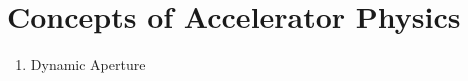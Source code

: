 \chapter{Concepts of Accelerator Physics}
\thumbforchapter{}
\chaptertoc{}
\newpage

\begin{enumerate}
    \color{red}
    \item Dynamic Aperture
\end{enumerate}









